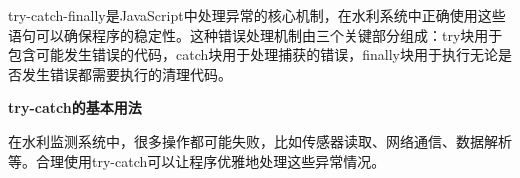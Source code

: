 try-catch-finally是JavaScript中处理异常的核心机制，在水利系统中正确使用这些语句可以确保程序的稳定性。这种错误处理机制由三个关键部分组成：try块用于包含可能发生错误的代码，catch块用于处理捕获的错误，finally块用于执行无论是否发生错误都需要执行的清理代码。

\textbf{try-catch的基本用法}

在水利监测系统中，很多操作都可能失败，比如传感器读取、网络通信、数据解析等。合理使用try-catch可以让程序优雅地处理这些异常情况。

\begin{Shaded}
\begin{Highlighting}[]
 
    \NormalTok{ \{}
        \OperatorTok{=} \OperatorTok{;}
        
        \NormalTok{ (}
              \NormalTok{(}\NormalTok{)}\OperatorTok{;}
\NormalTok{        \}}
        
        \OperatorTok{\textless{}}  \OperatorTok{||}\OperatorTok{\textgreater{}} \NormalTok{) \{}
              \NormalTok{(}\NormalTok{)}\OperatorTok{;}
\NormalTok{        \}}
        
        \NormalTok{(}\OperatorTok{,}\NormalTok{)}\OperatorTok{;}
        
        \NormalTok{ \{}
            \OperatorTok{:} \OperatorTok{,}
            \OperatorTok{:}\OperatorTok{,}
            \OperatorTok{:}  \NormalTok{()}
\NormalTok{        \}}\OperatorTok{;}
        

\end{Highlighting}
\end{Shaded}
